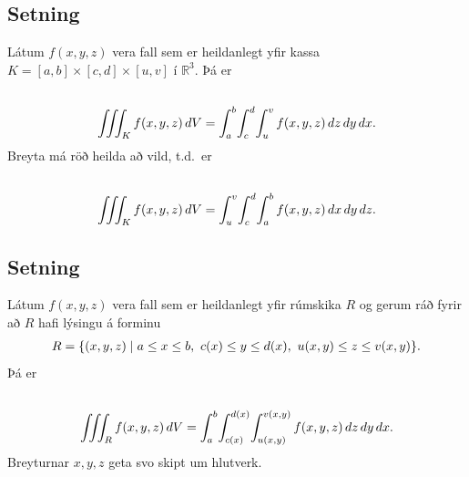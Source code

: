 \documentclass[a4paper,10pt,icelandic]{sphinxmanual}
\begin{document}
\subsection{Setning}
\label{Kafli4:id16}
Látum \(f(x,y,z)\) vera fall sem er heildanlegt yfir kassa
\(K=[a,b]\times[c,d]\times[u,v]\) í \({\mathbb  R}^3\). Þá er
\begin{gather}
\begin{split}\displaystyle\end{split}\notag\\\begin{split}\int\!\!\!\int\!\!\!\int_K f(x,y,z)\,dV=
\int_a^b\!\int_c^d\!\int_u^v f(x,y,z)\,dz\,dy\,dx.\end{split}\notag
\end{gather}
Breyta má röð heilda að vild, t.d. er
\begin{gather}
\begin{split}\displaystyle\end{split}\notag\\\begin{split}\int\!\!\!\int\!\!\!\int_K f(x,y,z)\,dV=
\int_u^v\!\int_c^d\!\int_a^b f(x,y,z)\,dx\,dy\,dz.\end{split}\notag
\end{gather}

\subsection{Setning}
\label{Kafli4:id17}
Látum \(f(x,y,z)\) vera fall sem er heildanlegt yfir rúmskika
\(R\) og gerum ráð fyrir að \(R\) hafi lýsingu á forminu
\begin{gather}
\begin{split}\displaystyle R=\{(x,y,z)\mid a\leq x\leq b,\ c(x)\leq y\leq d(x),\ u(x,y)\leq z\leq v(x,y)\}.\end{split}\notag
\end{gather}
Þá er
\begin{gather}
\begin{split}\displaystyle\end{split}\notag\\\begin{split}\int\!\!\!\int\!\!\!\int_R f(x,y,z)\,dV=
\int_a^b\!\int_{c(x)}^{d(x)}\!\int_{u(x,y)}^{v(x,y)} f(x,y,z)\,dz\,dy\,dx.\end{split}\notag
\end{gather}
Breyturnar \(x, y, z\) geta svo skipt um hlutverk.
\end{document}

